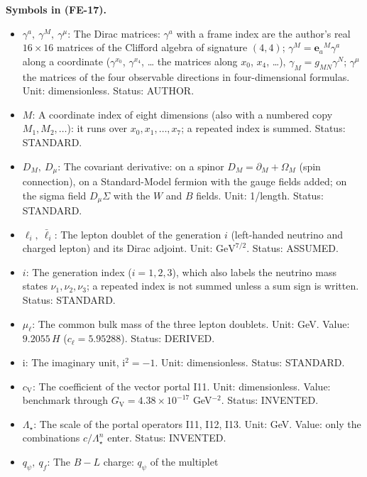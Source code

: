 \documentclass[
  10pt,
]{article}
\providecommand{\tightlist}{%
  \setlength{\itemsep}{0pt}\setlength{\parskip}{0pt}}
\begin{document}
\textbf{Symbols in (FE-17).}

\begin{itemize}
\tightlist
\item
  \(\gamma^a,\ \gamma^M,\ \gamma^\mu\): The Dirac matrices: \(\gamma^a\)
  with a frame index are the author's real \(16 \times 16\) matrices of
  the Clifford algebra of signature \((4, 4)\);
  \(\gamma^M = \mathbf{e}_a{}^M\gamma^a\) along a coordinate
  (\(\gamma^{x_0}\), \(\gamma^{x_4}\), \ldots{} the matrices along
  \(x_0\), \(x_4\), \ldots), \(\gamma_M = g_{MN}\gamma^N\);
  \(\gamma^\mu\) the matrices of the four observable directions in
  four-dimensional formulas. Unit: dimensionless. Status: AUTHOR.
\item
  \(M\): A coordinate index of eight dimensions (also with a numbered
  copy \(M_1, M_2, \dots\)): it runs over \(x_0, x_1, \dots, x_7\); a
  repeated index is summed. Status: STANDARD.
\item
  \(D_M,\ D_\mu\): The covariant derivative: on a spinor
  \(D_M = \partial_M + \Omega_M\) (spin connection), on a Standard-Model
  fermion with the gauge fields added; on the sigma field
  \(D_\mu\Sigma\) with the \(W\) and \(B\) fields. Unit: 1/length.
  Status: STANDARD.
\item
  \(\ell_i,\ \bar\ell_i\): The lepton doublet of the generation \(i\)
  (left-handed neutrino and charged lepton) and its Dirac adjoint. Unit:
  \(\mathrm{GeV}^{7/2}\). Status: ASSUMED.
\item
  \(i\): The generation index (\(i = 1, 2, 3\)), which also labels the
  neutrino mass states \(\nu_1, \nu_2, \nu_3\); a repeated index is not
  summed unless a sum sign is written. Status: STANDARD.
\item
  \(\mu_\ell\): The common bulk mass of the three lepton doublets. Unit:
  GeV. Value: \(9.2055\,H\) (\(c_\ell = 5.95288\)). Status: DERIVED.
\item
  \(\mathrm{i}\): The imaginary unit, \(\mathrm{i}^2 = -1\). Unit:
  dimensionless. Status: STANDARD.
\item
  \(c_{\mathrm{V}}\): The coefficient of the vector portal I11. Unit:
  dimensionless. Value: benchmark through
  \(G_{\mathrm{V}} = 4.38\times10^{-17}\) GeV\(^{-2}\). Status:
  INVENTED.
\item
  \(\Lambda_\star\): The scale of the portal operators I11, I12, I13.
  Unit: GeV. Value: only the combinations \(c/\Lambda_\star^n\) enter.
  Status: INVENTED.
\item
  \(q_\psi,\ q_f\): The \(B - L\) charge: \(q_\psi\) of the multiplet

\end{itemize}
\end{document}
